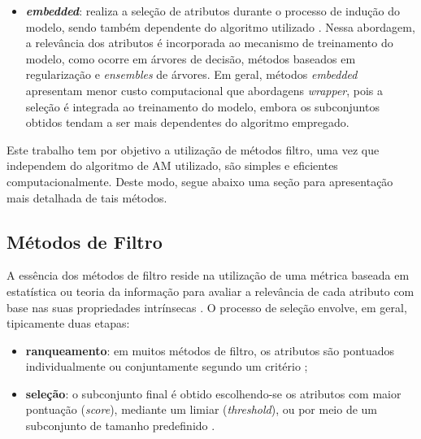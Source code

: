 \begin{itemize}
    \item \textbf{\textit{embedded}}: realiza a seleção de atributos durante o processo de indução do modelo, sendo também dependente do algoritmo utilizado \cite{bashir2022novel,Theng2024}. Nessa abordagem, a relevância dos atributos é incorporada ao mecanismo de treinamento do modelo, como ocorre em árvores de decisão, métodos baseados em regularização e \textit{ensembles} de árvores. Em geral, métodos \textit{embedded} apresentam menor custo computacional que abordagens \textit{wrapper}, pois a seleção é integrada ao treinamento do modelo, embora os subconjuntos obtidos tendam a ser mais dependentes do algoritmo empregado.
\end{itemize}

Este trabalho tem por objetivo a utilização de métodos filtro, uma vez que independem do algoritmo de AM utilizado, são simples e eficientes computacionalmente. Deste modo, segue abaixo uma seção para apresentação mais detalhada de tais métodos.


\subsection{Métodos de Filtro}
\label{subsec:filter_methods}

A essência dos métodos de filtro reside na utilização de uma métrica baseada em estatística ou teoria da informação para avaliar a relevância de cada atributo com base nas suas propriedades intrínsecas \cite{SolorioFernandez2020,Bouchlaghem2022,Theng2024}. O processo de seleção envolve, em geral, tipicamente duas etapas:
\begin{itemize}
    \item \textbf{ranqueamento}: em muitos métodos de filtro, os atributos são pontuados individualmente ou conjuntamente segundo um critério \cite{geng2007feature,Bouchlaghem2022};
    
    \item \textbf{seleção}: o subconjunto final é obtido escolhendo-se os atributos com maior pontuação (\textit{score}), mediante um limiar (\emph{threshold}), ou por meio de um subconjunto de tamanho predefinido \cite{jovic2015review,Theng2024}.
\end{itemize}


